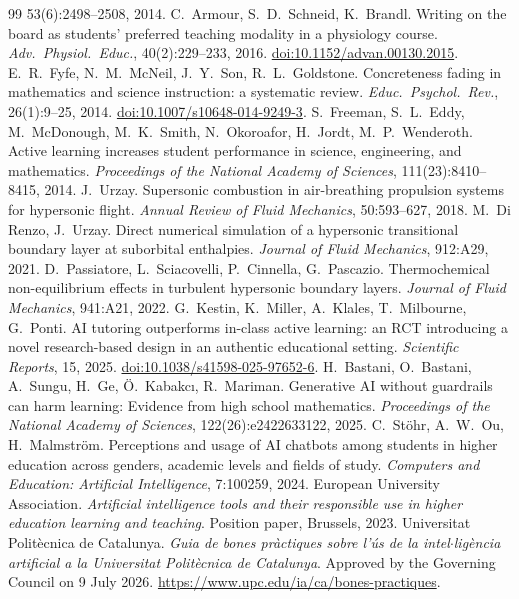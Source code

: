 \documentclass[11pt]{article}
\begin{document}
\begin{thebibliography}{99}
53(6):2498--2508, 2014.
 C.\ Armour, S.\ D.\ Schneid, K.\ Brandl. Writing on the board as students' preferred teaching modality in a physiology course. \emph{Adv.\ Physiol.\ Educ.}, 40(2):229--233, 2016. \href{https://doi.org/10.1152/advan.00130.2015}{doi:10.1152/advan.00130.2015}.
 E.\ R.\ Fyfe, N.\ M.\ McNeil, J.\ Y.\ Son, R.\ L.\ Goldstone. Concreteness fading in mathematics and science instruction: a systematic review. \emph{Educ.\ Psychol.\ Rev.}, 26(1):9--25, 2014. \href{https://doi.org/10.1007/s10648-014-9249-3}{doi:10.1007/s10648-014-9249-3}.
 S.\ Freeman, S.\ L.\ Eddy, M.\ McDonough, M.\ K.\ Smith, N.\ Okoroafor,
H.\ Jordt, M.\ P.\ Wenderoth. Active learning increases student performance in science,
engineering, and mathematics. \emph{Proceedings of the National Academy of Sciences},
111(23):8410--8415, 2014.
 J.\ Urzay. Supersonic combustion in air-breathing propulsion systems for
hypersonic flight. \emph{Annual Review of Fluid Mechanics}, 50:593--627, 2018.
 M.\ Di Renzo, J.\ Urzay. Direct numerical simulation of a
hypersonic transitional boundary layer at suborbital enthalpies. \emph{Journal of Fluid
Mechanics}, 912:A29, 2021.
 D.\ Passiatore, L.\ Sciacovelli, P.\ Cinnella, G.\ Pascazio.
Thermochemical non-equilibrium effects in turbulent hypersonic boundary layers.
\emph{Journal of Fluid Mechanics}, 941:A21, 2022.
 G.\ Kestin, K.\ Miller, A.\ Klales, T.\ Milbourne, G.\ Ponti. AI tutoring
outperforms in-class active learning: an RCT introducing a novel research-based design in an
authentic educational setting. \emph{Scientific Reports}, 15, 2025.
\href{https://doi.org/10.1038/s41598-025-97652-6}{doi:10.1038/s41598-025-97652-6}.
 H.\ Bastani, O.\ Bastani, A.\ Sungu, H.\ Ge, \"O.\ Kabakc\i{}, R.\
Mariman. Generative AI without guardrails can harm learning: Evidence from high school
mathematics. \emph{Proceedings of the National Academy of Sciences}, 122(26):e2422633122,
2025.
 C.\ St\"ohr, A.\ W.\ Ou, H.\ Malmstr\"om. Perceptions and usage of AI
chatbots among students in higher education across genders, academic levels and fields of
study. \emph{Computers and Education: Artificial Intelligence}, 7:100259, 2024.
\bibitem{EUA2023} European University Association. \emph{Artificial intelligence tools and
their responsible use in higher education learning and teaching}. Position paper,
Brussels, 2023.
 Universitat Polit\`ecnica de Catalunya. \emph{Guia de bones pr\`actiques sobre l'\'us de la intel$\cdot$lig\`encia artificial a la Universitat Polit\`ecnica de Catalunya}. Approved by the Governing Council on 9 July 2026. {\def\UrlBreaks{\do\/\do\-}\url{https://www.upc.edu/ia/ca/bones-practiques}}.

\end{thebibliography}
\end{document}
